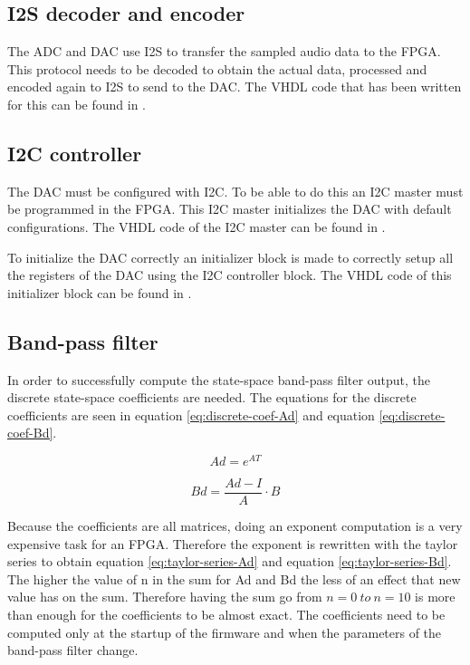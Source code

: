 \subsection{I2S decoder and encoder}
The ADC and DAC use I2S to transfer the sampled audio data to the FPGA. This protocol needs to be decoded to obtain the actual data, processed and encoded again to I2S to send to the DAC. The VHDL code that has been written for this can be found in . 

\subsection{I2C controller}
The DAC must be configured with I2C. To be able to do this an I2C master must be programmed in the FPGA. This I2C master initializes the DAC with default configurations. The VHDL code of the I2C master can be found in . 

To initialize the DAC correctly an initializer block is made to correctly setup all the registers of the DAC using the I2C controller block. The VHDL code of this initializer block can be found in . 

\subsection{Band-pass filter}
In order to successfully compute the state-space band-pass filter output, the discrete state-space coefficients are needed. The equations for the discrete coefficients are seen in equation \ref{eq:discrete-coef-Ad} and equation \ref{eq:discrete-coef-Bd}.

\begin{equation}
    Ad=e^{AT}
    \label{eq:discrete-coef-Ad}
\end{equation}

\begin{equation}
    Bd=\frac{Ad-I}{A}\cdot B
    \label{eq:discrete-coef-Bd}
\end{equation}

Because the coefficients are all matrices, doing an exponent computation is a very expensive task for an FPGA. Therefore the exponent is rewritten with the taylor series to obtain equation \ref{eq:taylor-series-Ad} and equation \ref{eq:taylor-series-Bd}. The higher the value of n in the sum for Ad and Bd the less of an effect that new value has on the sum. Therefore having the sum go from $n=0\ to\ n=10$ is more than enough for the coefficients to be almost exact. The coefficients need to be computed only at the startup of the firmware and when the parameters of the band-pass filter change. 

